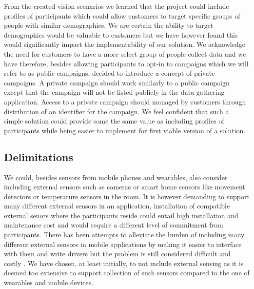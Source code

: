 From the created vision scenarios we learned that the project could include profiles of participants which could allow customers to target specific groups of people with similar demographics. We are certain the ability to target demographics would be valuable to customers but we have however found this would significantly impact the implementability of our solution. We acknowledge the need for customers to have a more select group of people collect data and we have therefore, besides allowing participants to opt-in to campaigns which we will refer to as public campaigns, decided to introduce a concept of private campaigns. A private campaign should work similarly to a public campaign except that the campaign will not be listed publicly in the data gathering application. Access to a private campaign should managed by customers through distribution of an identifier for the campaign. We feel confident that such a simple solution could provide some the same value as including profiles of participants while being easier to implement for first viable version of a solution.   

\subsection{Delimitations}
\label{sub:delimitations}
We could, besides sensors from mobile phones and wearables, also consider including external sensors such as cameras or smart home sensors like movement detectors or temperature sensors in the room. It is however demanding to support many different external sensors in an application, installation of compatible external senors where the participants reside could entail high installation and maintenance cost and would require a different level of commitment from participants. There has been attempts to alleviate the burden of including many different external sensors in mobile applications by making it easier to interface with them and write drivers but the problem is still considered difficult and costly \parencite{open_data_kit}. We have chosen, at least initially, to not include external sensing as it is deemed too extensive to support collection of such sensors compared to the one of wearables and mobile devices.
